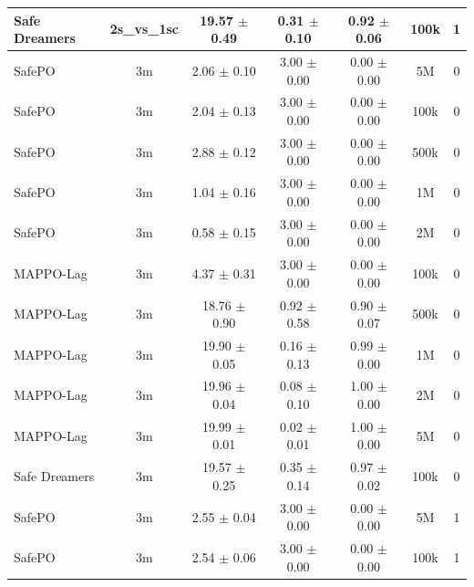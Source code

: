 \begin{longtable}{lcccccc}
Safe Dreamers & 2s\_vs\_1sc & 19.57 $\pm$ 0.49 & 0.31 $\pm$ 0.10 & 0.92 $\pm$ 0.06 & 100k & 1 \\
\midrule
SafePO & 3m & \textcolor{green!60!black}{2.06 $\pm$ 0.10} & \textcolor{green!60!black}{3.00 $\pm$ 0.00} & \textcolor{green!60!black}{0.00 $\pm$ 0.00} & 5M & 0 \\
SafePO & 3m & \textcolor{green!60!black}{2.04 $\pm$ 0.13} & \textcolor{green!60!black}{3.00 $\pm$ 0.00} & \textcolor{green!60!black}{0.00 $\pm$ 0.00} & 100k & 0 \\
SafePO & 3m & \textcolor{green!60!black}{2.88 $\pm$ 0.12} & \textcolor{green!60!black}{3.00 $\pm$ 0.00} & \textcolor{green!60!black}{0.00 $\pm$ 0.00} & 500k & 0 \\
SafePO & 3m & \textcolor{green!60!black}{1.04 $\pm$ 0.16} & \textcolor{green!60!black}{3.00 $\pm$ 0.00} & \textcolor{green!60!black}{0.00 $\pm$ 0.00} & 1M & 0 \\
SafePO & 3m & \textcolor{green!60!black}{0.58 $\pm$ 0.15} & \textcolor{green!60!black}{3.00 $\pm$ 0.00} & \textcolor{green!60!black}{0.00 $\pm$ 0.00} & 2M & 0 \\
MAPPO-Lag & 3m & \textcolor{green!60!black}{4.37 $\pm$ 0.31} & \textcolor{green!60!black}{3.00 $\pm$ 0.00} & \textcolor{green!60!black}{0.00 $\pm$ 0.00} & 100k & 0 \\
MAPPO-Lag & 3m & \textcolor{green!60!black}{18.76 $\pm$ 0.90} & \textcolor{green!60!black}{0.92 $\pm$ 0.58} & \textcolor{green!60!black}{0.90 $\pm$ 0.07} & 500k & 0 \\
MAPPO-Lag & 3m & \textcolor{red!70!black}{19.90 $\pm$ 0.05} & \textcolor{red!70!black}{0.16 $\pm$ 0.13} & \textcolor{red!70!black}{0.99 $\pm$ 0.00} & 1M & 0 \\
MAPPO-Lag & 3m & \textcolor{red!70!black}{19.96 $\pm$ 0.04} & \textcolor{red!70!black}{0.08 $\pm$ 0.10} & \textcolor{red!70!black}{1.00 $\pm$ 0.00} & 2M & 0 \\
MAPPO-Lag & 3m & \textcolor{red!70!black}{19.99 $\pm$ 0.01} & \textcolor{red!70!black}{0.02 $\pm$ 0.01} & \textcolor{red!70!black}{1.00 $\pm$ 0.00} & 5M & 0 \\
Safe Dreamers & 3m & 19.57 $\pm$ 0.25 & 0.35 $\pm$ 0.14 & 0.97 $\pm$ 0.02 & 100k & 0 \\
\midrule
SafePO & 3m & \textcolor{green!60!black}{2.55 $\pm$ 0.04} & \textcolor{green!60!black}{3.00 $\pm$ 0.00} & \textcolor{green!60!black}{0.00 $\pm$ 0.00} & 5M & 1 \\
SafePO & 3m & \textcolor{green!60!black}{2.54 $\pm$ 0.06} & \textcolor{green!60!black}{3.00 $\pm$ 0.00} & \textcolor{green!60!black}{0.00 $\pm$ 0.00} & 100k & 1 \\

\end{longtable}
